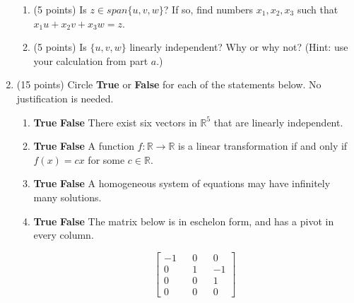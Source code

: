 \documentclass[12 pt]{report}
\begin{document}
\begin{enumerate}
\begin{enumerate} \item (5 points) Is $z \in span\{u, v ,w \}$? If so, find numbers $x_1, x_2, x_3$ such that $x_1 u + x_2 v + x_3 w = z$. 

\vfill 

\item (5 points) Is $\{u, v, w\}$ linearly independent? Why or why not? (Hint: use your calculation from part $a$.)

\vfill

\end{enumerate} 

\newpage

\item (15 points) Circle \textbf{True} or \textbf{False} for each of the statements below. No justification is needed. 

\begin{enumerate} \item \textbf{True} \hspace{5pt} \textbf{False} \hspace{5pt} There exist six vectors in $\mathbb{R}^5$ that are linearly independent.

\vfill 

\item \textbf{True} \hspace{5pt} \textbf{False} \hspace{5pt} A function $f: \mathbb{R} \to \mathbb{R}$ is a linear transformation if and only if $f(x) = cx$ for some $c \in \mathbb{R}$. 

\vfill 

\item \textbf{True} \hspace{5pt} \textbf{False} \hspace{5pt} A homogeneous system of equations may have infinitely many solutions. 

\vfill 

\item \textbf{True} \hspace{5pt} \textbf{False} \hspace{5pt} The matrix below is in eschelon form, and has a pivot in every column. 

\[
\begin{bmatrix} -1 && 0 && 0 \\ 0 && 1 && -1 \\ 0 && 0 && 1 \\ 0 && 0 && 0 \end{bmatrix}
\]


\end{enumerate}
\end{enumerate}
\end{document}
